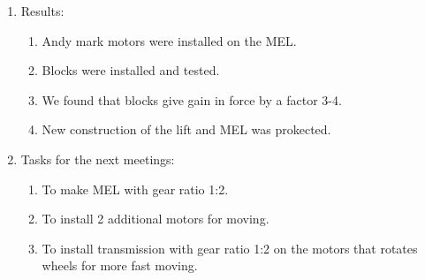 \begin{enumerate}
	\item Results:
	\begin{enumerate}
		
		\item Andy mark motors were installed on the MEL.
		
		\item Blocks were installed and tested.
		
		\item We found that blocks give gain in force by a factor 3-4.
		
		\item New construction of the lift and MEL was prokected.
		
	\end{enumerate}
	
	\item Tasks for the next meetings:
	\begin{enumerate}
		
		\item To make MEL with gear ratio 1:2.
		
		\item To install 2 additional motors for moving.
		
        \item To install transmission with gear ratio 1:2 on the motors that rotates wheels for more fast moving.
			
	\end{enumerate}
\end{enumerate}
\fillpage
